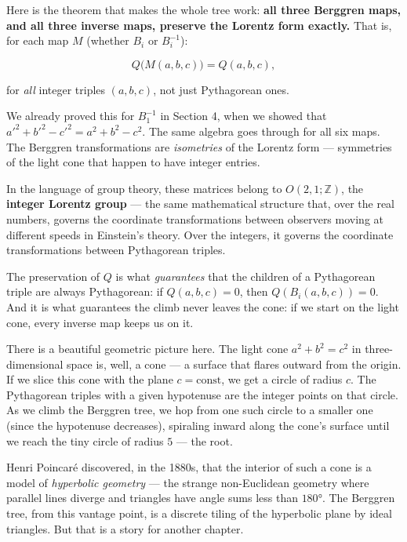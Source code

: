 \documentclass[11pt,openany]{book}
\theoremstyle{definition}
\theoremstyle{plain}
\theoremstyle{remark}
\begin{document}
Here is the theorem that makes the whole tree work: \textbf{all three Berggren maps, and all three inverse maps, preserve the Lorentz form exactly.} That is, for each map $M$ (whether $B_i$ or $B_i^{-1}$):

$$Q\bigl(M(a, b, c)\bigr) = Q(a, b, c),$$

for \textit{all} integer triples $(a, b, c)$, not just Pythagorean ones.

We already proved this for $B_1^{-1}$ in Section 4, when we showed that ${a'}^2 + {b'}^2 - {c'}^2 = a^2 + b^2 - c^2$. The same algebra goes through for all six maps. The Berggren transformations are \textit{isometries} of the Lorentz form — symmetries of the light cone that happen to have integer entries.

In the language of group theory, these matrices belong to $O(2,1;\mathbb{Z})$, the \textbf{integer Lorentz group} — the same mathematical structure that, over the real numbers, governs the coordinate transformations between observers moving at different speeds in Einstein's theory. Over the integers, it governs the coordinate transformations between Pythagorean triples.

The preservation of $Q$ is what \textit{guarantees} that the children of a Pythagorean triple are always Pythagorean: if $Q(a,b,c) = 0$, then $Q(B_i(a,b,c)) = 0$. And it is what guarantees the climb never leaves the cone: if we start on the light cone, every inverse map keeps us on it.

There is a beautiful geometric picture here. The light cone $a^2 + b^2 = c^2$ in three-dimensional space is, well, a cone — a surface that flares outward from the origin. If we slice this cone with the plane $c = \text{const}$, we get a circle of radius $c$. The Pythagorean triples with a given hypotenuse are the integer points on that circle. As we climb the Berggren tree, we hop from one such circle to a smaller one (since the hypotenuse decreases), spiraling inward along the cone's surface until we reach the tiny circle of radius $5$ — the root.

Henri Poincaré discovered, in the 1880s, that the interior of such a cone is a model of \textit{hyperbolic geometry} — the strange non-Euclidean geometry where parallel lines diverge and triangles have angle sums less than $180°$. The Berggren tree, from this vantage point, is a discrete tiling of the hyperbolic plane by ideal triangles. But that is a story for another chapter.
\end{document}
